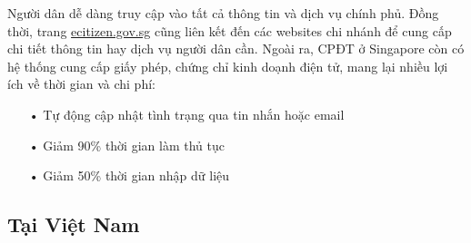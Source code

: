 \documentclass[a4paper]{article}
\begin{document}
Người dân dễ dàng truy cập vào tất cả thông tin và dịch vụ chính phủ. Đồng thời, trang \url{ecitizen.gov.sg} cũng liên kết đến các websites chi nhánh để cung cấp chi tiết thông tin hay dịch vụ người dân cần. 
Ngoài ra, CPĐT ở Singapore còn có hệ thống cung cấp giấy phép, chứng chỉ kinh doạnh điện tử, mang lại nhiều lợi ích về thời gian và chi phí:
	\begin{itemize}
	\item[•]Tự động cập nhật tình trạng qua tin nhắn hoặc email
	\item[•]Giảm 90\% thời gian làm thủ tục
	\item[•]Giảm 50\% thời gian nhập dữ liệu  
	\end{itemize}
\subsection{Tại Việt Nam}
\end{document}
